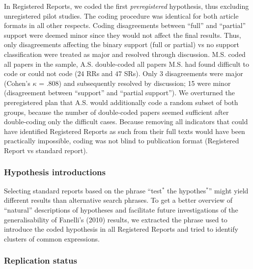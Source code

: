 \documentclass[british,,jou,floatsintext]{apa6}
\begin{document}
In Registered Reports, we coded the first \emph{preregistered} hypothesis, thus excluding unregistered pilot studies.
The coding procedure was identical for both article formats in all other respects.
Coding disagreements between \enquote{full} and \enquote{partial} support were deemed minor since they would not affect the final results.
Thus, only disagreements affecting the binary support (full or partial) vs no support classification were treated as major and resolved through discussion.
M.S. coded all papers in the sample, A.S. double-coded all papers M.S. had found difficult to code or could not code (\(24\) RRs and \(47\) SRs).
Only 3 disagreements were major (Cohen's \(\kappa\) = .808) and subsequently resolved by discussion; 15 were minor (disagreement between \enquote{support} and \enquote{partial support}).
We overturned the preregistered plan that A.S. would additionally code a random subset of both groups, because the number of double-coded papers seemed sufficient after double-coding only the difficult cases.
Because removing all indicators that could have identified Registered Reports as such from their full texts would have been practically impossible, coding was not blind to publication format (Registered Report vs standard report).

\hypertarget{hypothesis-introductions}{%
\subsubsection{Hypothesis introductions}\label{hypothesis-introductions}}

Selecting standard reports based on the phrase \enquote{test\(^\ast\) the hypothes\(^\ast\)} might yield different results than alternative search phrases.
To get a better overview of \enquote{natural} descriptions of hypotheses and facilitate future investigations of the generalisability of Fanelli's (2010) results, we extracted the phrase used to introduce the coded hypothesis in all Registered Reports and tried to identify clusters of common expressions.

\hypertarget{replication-status}{%
\subsubsection{Replication status}\label{replication-status}}
\end{document}
